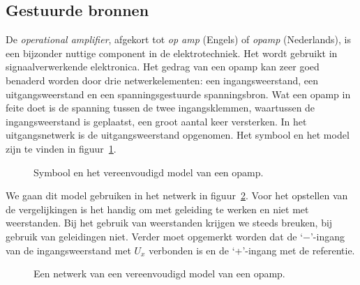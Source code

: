 \subsection{Gestuurde bronnen}

\begin{example}
De \textsl{operational amplifier}, afgekort tot \textsl{op amp} (Engels) of \textsl{opamp} (Nederlands), is een bijzonder nuttige component in de elektrotechniek. Het wordt gebruikt in signaalverwerkende elektronica. Het gedrag van een opamp kan zeer goed benaderd worden door drie netwerkelementen: een ingangsweerstand, een uitgangsweerstand en een spanningsgestuurde spanningsbron. Wat een opamp in feite doet is de spanning tussen de twee ingangsklemmen, waartussen de ingangsweerstand is geplaatst, een groot aantal keer versterken. In het uitgangsnetwerk is de uitgangsweerstand opgenomen. Het symbool en het model zijn te vinden in figuur~\ref{fig:gelmodelopamp}.

\begin{figure}[H]
\centering
{}
\caption{Symbool en het vereenvoudigd model van een opamp.}
\label{fig:gelmodelopamp}
\end{figure}

We gaan dit model gebruiken in het netwerk in figuur~\ref{fig:gelmodelopampinverter}. Voor het opstellen van de vergelijkingen is het handig om met geleiding te werken en niet met weerstanden. Bij het gebruik van weerstanden krijgen we steeds breuken, bij gebruik van geleidingen niet. Verder moet opgemerkt worden dat de `$-$'-ingang van de ingangsweerstand met $U_x$ verbonden is en de `+'-ingang met de referentie.

\begin{figure}[H]
\centering
{}
\caption{Een netwerk van een vereenvoudigd model van een opamp.}
\label{fig:gelmodelopampinverter}
\end{figure}


\end{example}
